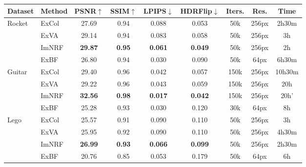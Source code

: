 \begingroup
\begin{table*}[!htb]
    \centering
    \begin{tabular*}{\textwidth}{ l | l | c c c c | c c c }
        Dataset & Method & PSNR$\uparrow$ & SSIM$\uparrow$ & LPIPS$\downarrow$ & HDRFlip$\downarrow$ & Iters. & Res. & Time \\
        \midrule
        
        \multirow{4}{*}{Rocket}
        & ExCol & 27.69 & 0.94 & 0.088 & 0.053 & 50k & 256px & 2h30m \\
        & ExVA & 29.14 & 0.94 & 0.083 & 0.058 & 50k & 256px & 3h \\
        & ImNRF & \textbf{29.87} & \textbf{0.95} & \textbf{0.061} & \textbf{0.049} & 50k & 256px & 2h \\
        & \color{gray}ExBF & \color{gray}26.80 & \color{gray}0.94 & \color{gray}0.030 & 0.\color{gray}090 & \color{gray}50k & \color{gray}64px & \color{gray}6h30m \\
        \midrule
        
        \multirow{4}{*}{Guitar}
        & ExCol & 29.40 & 0.96 & 0.042 & 0.057 & 150k & 256px & 10h30m \\
        & ExVA & 29.22 & 0.96 & 0.043 & 0.059 & 150k & 256px & 20h \\
        & ImNRF & \textbf{32.56} & \textbf{0.98} & \textbf{0.017} & \textbf{0.042} & 150k & 256px & \color{bronze}20h' \\
        & \color{gray}ExBF & \color{gray}25.28 & \color{gray}0.93 & \color{gray}0.030 & \color{gray}0.120 & \color{gray}30k & \color{gray}64px & \color{gray}8h \\
        \midrule
        
        \multirow{4}{*}{Lego}
        & ExCol & 25.57 & 0.91 & 0.090 & 0.110 & 50k & 256px & 3h \\
        & ExVA & 25.95 & 0.92 & 0.090 & 0.110 & 50k & 256px & 4h30m \\
        & ImNRF & \textbf{26.99} & \textbf{0.93} & \textbf{0.066} & \textbf{0.099} & 50k & 256px & 2h30m \\
        & \color{gray}ExBF & \color{gray}20.76 & \color{gray}0.85 & \color{gray}0.053 & \color{gray}0.179 & \color{gray}50k & \color{gray}64px & \color{gray}6h \\
        \midrule
        

\end{tabular*}
\end{table*}
